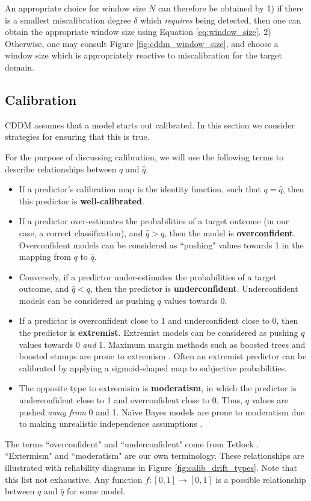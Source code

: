 An appropriate choice for window size $N$ can therefore be obtained by 1) if there is a smallest miscalibration degree $\delta$ which {\it requires} being detected, then one can obtain the appropriate window size using Equation \ref{eq:window_size}. 2) Otherwise, one may consult Figure \ref{fig:cddm_window_size}, and choose a window size which is appropriately reactive to miscalibration for the target domain.


\subsection{Calibration}

CDDM assumes that a model starts out calibrated. In this section we consider strategies for ensuring that this is true.

\cite{nn_calibration}
\cite{trust_model_uncertainty}


For the purpose of discussing calibration, we will use the following terms to describe relationships between $q$ and $\hat{q}$.
\begin{itemize}
  \item If a predictor’s calibration map is the identity function, such that $q=\hat{q}$, then this predictor is {\bf well-calibrated}.
  \item If a predictor over-estimates the probabilities of a target outcome (in our case, a correct classification), and $\hat{q}>q$, then the model is {\bf overconfident}. Overconfident models can be considered as ``pushing" values towards 1 in the mapping from $q$ to $\hat{q}$.
  \item Conversely, if a predictor under-estimates the probabilities of a target outcome, and $\hat{q}<q$, then the predictor is {\bf underconfident}. Underconfident models can be considered as pushing $q$ values towards 0.
  \item If a predictor is overconfident close to 1 and underconfident close to 0, then the predictor is {\bf extremist}. Extremist models can be considered as pushing $q$ values towards 0 {\it and} 1. Maximum margin methods such as boosted trees and boosted stumps are prone to extremism \cite{calibrating}. Often an extremist predictor can be calibrated by applying a sigmoid-shaped map to subjective probabilities.
  \item The opposite type to extremisim is {\bf moderatism}, in which the predictor is underconfident close to 1 and overconfident close to 0. Thus, $q$ values are pushed {\it away from} 0 and 1. Na\"{i}ve Bayes models are prone to moderatism due to making unrealistic independence assumptions \cite{calibrating}. 
\end{itemize}
The terms ``overconfident" and ``underconfident" come from Tetlock \cite{superforecasting}. ``Extermism" and ``moderatism" are our own terminology. These relationships are illustrated with reliability diagrams in Figure \ref{fig:calib_drift_types}. Note that this list not exhaustive. Any function $f:[0,1]\rightarrow[0,1]$ is a possible relationship between $q$ and $\hat{q}$ for some model.

